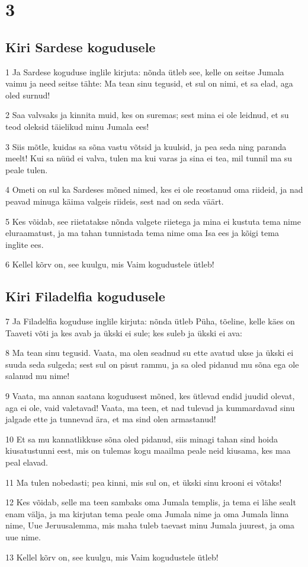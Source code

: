 \chapter{3}

\section*{Kiri Sardese kogudusele}

\par 1 Ja Sardese koguduse inglile kirjuta: nõnda ütleb see, kelle on seitse Jumala vaimu ja need seitse tähte: Ma tean sinu tegusid, et sul on nimi, et sa elad, aga oled surnud!
\par 2 Saa valvsaks ja kinnita muid, kes on suremas; sest mina ei ole leidnud, et su teod oleksid täielikud minu Jumala ees!
\par 3 Siis mõtle, kuidas sa sõna vastu võtsid ja kuulsid, ja pea seda ning paranda meelt! Kui sa nüüd ei valva, tulen ma kui varas ja sina ei tea, mil tunnil ma su peale tulen.
\par 4 Ometi on sul ka Sardeses mõned nimed, kes ei ole reostanud oma riideid, ja nad peavad minuga käima valgeis riideis, sest nad on seda väärt.
\par 5 Kes võidab, see riietatakse nõnda valgete riietega ja mina ei kustuta tema nime eluraamatust, ja ma tahan tunnistada tema nime oma Isa ees ja kõigi tema inglite ees.
\par 6 Kellel kõrv on, see kuulgu, mis Vaim kogudustele ütleb!

\section*{Kiri Filadelfia kogudusele}

\par 7 Ja Filadelfia koguduse inglile kirjuta: nõnda ütleb Püha, tõeline, kelle käes on Taaveti võti ja kes avab ja ükski ei sule; kes suleb ja ükski ei ava:
\par 8 Ma tean sinu tegusid. Vaata, ma olen seadnud su ette avatud ukse ja ükski ei suuda seda sulgeda; sest sul on pisut rammu, ja sa oled pidanud mu sõna ega ole salanud mu nime!
\par 9 Vaata, ma annan saatana kogudusest mõned, kes ütlevad endid juudid olevat, aga ei ole, vaid valetavad! Vaata, ma teen, et nad tulevad ja kummardavad sinu jalgade ette ja tunnevad ära, et ma sind olen armastanud!
\par 10 Et sa mu kannatlikkuse sõna oled pidanud, siis minagi tahan sind hoida kiusatustunni eest, mis on tulemas kogu maailma peale neid kiusama, kes maa peal elavad.
\par 11 Ma tulen nobedasti; pea kinni, mis sul on, et ükski sinu krooni ei võtaks!
\par 12 Kes võidab, selle ma teen sambaks oma Jumala templis, ja tema ei lähe sealt enam välja, ja ma kirjutan tema peale oma Jumala nime ja oma Jumala linna nime, Uue Jeruusalemma, mis maha tuleb taevast minu Jumala juurest, ja oma uue nime.
\par 13 Kellel kõrv on, see kuulgu, mis Vaim kogudustele ütleb!

